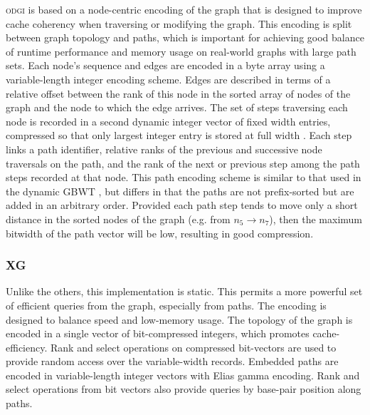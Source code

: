 \documentclass{article}
\begin{document}
\textsc{odgi} is based on a node-centric encoding of the graph that is designed to improve cache coherency when traversing or modifying the graph.
This encoding is split between graph topology and paths, which is important for achieving good balance of runtime performance and memory usage on real-world graphs with large path sets.
Each node's sequence and edges are encoded in a byte array using a variable-length integer encoding scheme.
Edges are described in terms of a relative offset between the rank of this node in the sorted array of nodes of the graph and the node to which the edge arrives.
The set of steps traversing each node is recorded in a second dynamic integer vector of fixed width entries, compressed so that only largest integer entry is stored at full width \cite{prezza2017framework}.
Each step links a path identifier, relative ranks of the previous and successive node traversals on the path, and the rank of the next or previous step among the path steps recorded at that node.
This path encoding scheme is similar to that used in the dynamic GBWT \cite{Siren_2019}, but differs in that the paths are not prefix-sorted but are added in an arbitrary order.
Provided each path step tends to move only a short distance in the sorted nodes of the graph (e.g. from $n_{5} \to n_{7}$), then the maximum bitwidth of the path vector will be low, resulting in good compression.


\subsubsection{XG}

Unlike the others, this implementation is static.
This permits a more powerful set of efficient queries from the graph, especially from paths.
The encoding is designed to balance speed and low-memory usage.
The topology of the graph is encoded in a single vector of bit-compressed integers, which promotes cache-efficiency.
Rank and select operations on compressed bit-vectors are used to provide random access over the variable-width records.
Embedded paths are encoded in variable-length integer vectors with Elias gamma encoding.
Rank and select operations from bit vectors also provide queries by base-pair position along paths.
\end{document}
